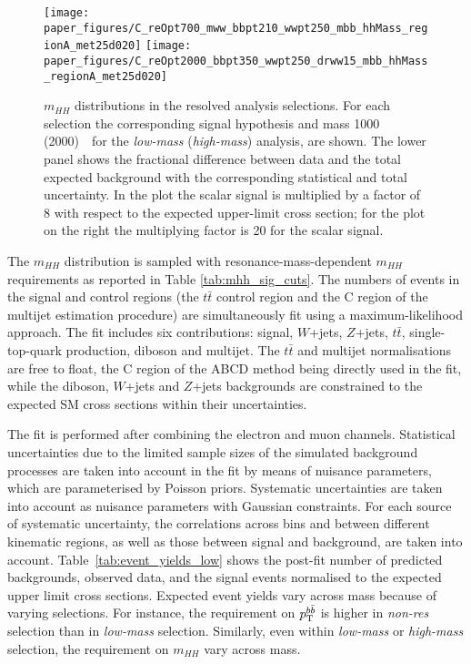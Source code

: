 \begin{figure}
\begin{center}
\texttt{[image: paper\_figures/C\_reOpt700\_mww\_bbpt210\_wwpt250\_mbb\_hhMass\_regionA\_met25d020]}
\texttt{[image: paper\_figures/C\_reOpt2000\_bbpt350\_wwpt250\_drww15\_mbb\_hhMass\_regionA\_met25d020]}
\end{center}
\caption[$m_{HH}$ distributions for non-resonant and \emph{m500} selections in the resolved analysis for the low and high mass selections ]{$m_{HH}$ distributions in the resolved analysis selections. For each selection the corresponding
 signal hypothesis and mass 1000 (2000)~\GeV\ for the  \emph{low-mass} (\emph{high-mass}) analysis, are shown.  The lower panel shows the fractional difference between data and the total expected background
 with the corresponding statistical and total uncertainty. In the plot the scalar signal is multiplied by a factor of 8 with respect to the expected upper-limit cross section;%
for the plot on the right
the multiplying factor is 20 for the scalar signal.}
\label{fig:mhh_2}
\end{figure}
 
 
The $m_{HH}$ distribution is sampled with resonance-mass-dependent
$m_{HH}$ requirements as reported in Table \ref{tab:mhh_sig_cuts}.
The numbers of events in the signal and control regions (the $t\bar{t}$
control region and the C region of the multijet estimation procedure) are
simultaneously fit using a  maximum-likelihood approach. The fit includes six contributions: signal, $W$+jets,
$Z$+jets, $t\bar{t}$, single-top-quark production, diboson and multijet. The
$t\bar{t}$ and multijet normalisations are free to float, the C
region of the ABCD method being directly used in the fit, while the
diboson, $W$+jets and $Z$+jets backgrounds are constrained
to the expected SM cross sections within their uncertainties.
 
The fit is performed after combining the electron and muon channels. Statistical uncertainties due to the limited
sample sizes of the simulated background processes are taken into
account in the fit by means of nuisance parameters, which are
parameterised by Poisson priors. Systematic uncertainties are taken into account as
nuisance parameters with Gaussian constraints. For each
source of systematic uncertainty, the correlations across bins and
between different kinematic regions, as well as those between signal
and background, are taken into account.
Table~\ref{tab:event_yields_low} shows
the post-fit number of predicted backgrounds, observed data, and the
signal events normalised to the expected upper limit cross
sections. Expected event yields vary across mass because of varying selections. For instance, the requirement on $p_{\rm T}^{b \bar{b}}$ is higher in \emph{non-res} selection than in \emph{low-mass} selection. Similarly, even within \emph{low-mass} or \emph{high-mass} selection, the requirement on $m_{HH}$ vary across mass.  
 
